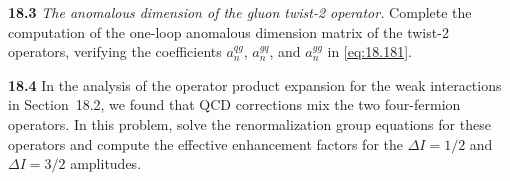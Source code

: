 \textbf{18.3} \emph{The anomalous dimension of the gluon twist-2 operator.}
Complete the computation of the one-loop anomalous dimension matrix of the
twist-2 operators, verifying the coefficients $a_n^{qg}$, $a_n^{gq}$, and
$a_n^{gg}$ in \eqref{eq:18.181}.

\textbf{18.4} In the analysis of the operator product expansion for the
weak interactions in Section~18.2, we found that QCD corrections mix the two
four-fermion operators.  In this problem, solve the renormalization group
equations for these operators and compute the effective enhancement factors
for the $\Delta I = 1/2$ and $\Delta I = 3/2$ amplitudes.
